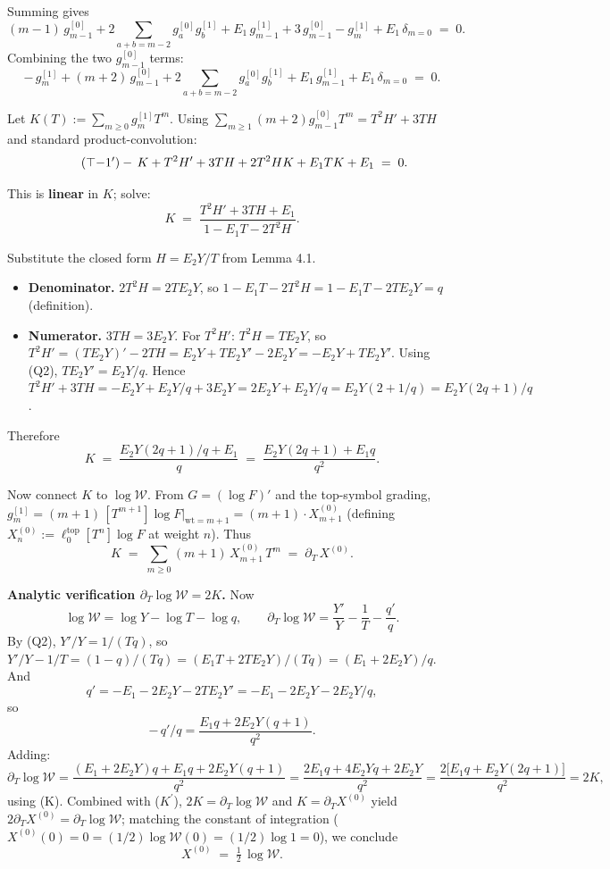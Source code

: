 \documentclass[11pt]{article}
\newcommand{\W}{\mathcal{W}}
\begin{document}
Summing gives
$$(m-1)\,g_{m-1}^{[0]} + 2\sum_{a+b=m-2} g_a^{[0]} g_b^{[1]} + E_1\,g_{m-1}^{[1]} + 3\,g_{m-1}^{[0]} - g_m^{[1]} + E_1\,\delta_{m=0} \;=\; 0.$$
Combining the two $g_{m-1}^{[0]}$ terms:
$$-\,g_m^{[1]} + (m+2)\,g_{m-1}^{[0]} + 2\sum_{a+b=m-2} g_a^{[0]} g_b^{[1]} + E_1\,g_{m-1}^{[1]} + E_1\,\delta_{m=0} \;=\; 0.$$

Let $K(T) := \sum_{m\ge 0} g_m^{[1]} T^m$. Using $\sum_{m\ge 1}(m+2) g_{m-1}^{[0]} T^m = T^2 H' + 3 T H$ and standard product-convolution:
\begin{equation}\tag{$\top{-1}'$}
-\,K + T^2 H' + 3 T H + 2 T^2 H K + E_1 T K + E_1 \;=\; 0.
\end{equation}

This is \textbf{linear} in $K$; solve:
$$K \;=\; \frac{T^2 H' + 3 T H + E_1}{1 - E_1 T - 2 T^2 H}.$$

Substitute the closed form $H = E_2 Y/T$ from Lemma 4.1.

\begin{itemize}
  \item \textbf{Denominator.} $2 T^2 H = 2 T E_2 Y$, so $1 - E_1 T - 2 T^2 H = 1 - E_1 T - 2 T E_2 Y = q$ (definition).
  \item \textbf{Numerator.} $3 T H = 3 E_2 Y$. For $T^2 H'$: $T^2 H = T E_2 Y$, so $T^2 H' = (T E_2 Y)' - 2 T H = E_2 Y + T E_2 Y' - 2 E_2 Y = -E_2 Y + T E_2 Y'$. Using (Q2), $T E_2 Y' = E_2 Y/q$. Hence $T^2 H' + 3 T H = -E_2 Y + E_2 Y/q + 3 E_2 Y = 2 E_2 Y + E_2 Y/q = E_2 Y(2 + 1/q) = E_2 Y (2q+1)/q$.
\end{itemize}

Therefore
\begin{equation}\tag{K}
K \;=\; \frac{E_2 Y(2q+1)/q + E_1}{q} \;=\; \frac{E_2 Y(2q+1) + E_1 q}{q^2}.
\end{equation}

Now connect $K$ to $\log \W$. From $G = (\log F)'$ and the top-symbol grading, $g_m^{[1]} = (m+1)\,[T^{m+1}]\log F\big|_{\mathrm{wt}=m+1} = (m+1) \cdot X^{(0)}_{m+1}$ (defining $X^{(0)}_n := \ell^{\mathrm{top}}_0[T^n]\log F$ at weight $n$). Thus
\begin{equation}\tag{$K'$}
K \;=\; \sum_{m \ge 0} (m+1)\,X^{(0)}_{m+1}\,T^m \;=\; \partial_T\,X^{(0)}.
\end{equation}

\textbf{Analytic verification $\partial_T \log \W = 2 K$.} Now
$$\log\W = \log Y - \log T - \log q, \qquad \partial_T\log\W = \frac{Y'}{Y} - \frac{1}{T} - \frac{q'}{q}.$$
By (Q2), $Y'/Y = 1/(Tq)$, so $Y'/Y - 1/T = (1 - q)/(Tq) = (E_1 T + 2 T E_2 Y)/(Tq) = (E_1 + 2 E_2 Y)/q$. And
$$q' = -E_1 - 2 E_2 Y - 2 T E_2 Y' = -E_1 - 2 E_2 Y - 2 E_2 Y/q,$$
so
$$-\,q'/q = \frac{E_1 q + 2 E_2 Y (q + 1)}{q^2}.$$
Adding:
$$\partial_T\log\W = \frac{(E_1 + 2 E_2 Y) q + E_1 q + 2 E_2 Y (q+1)}{q^2} = \frac{2 E_1 q + 4 E_2 Y q + 2 E_2 Y}{q^2} = \frac{2\big[E_1 q + E_2 Y(2q+1)\big]}{q^2} = 2 K,$$
using (K). Combined with ($K^{\prime}$), $2 K = \partial_T\log\W$ and $K = \partial_T X^{(0)}$ yield $2\partial_T X^{(0)} = \partial_T \log \W$; matching the constant of integration ($X^{(0)}(0) = 0 = (1/2)\log \W(0) = (1/2)\log 1 = 0$), we conclude
$$X^{(0)} \;=\; \tfrac{1}{2}\,\log\W.$$
\end{document}
